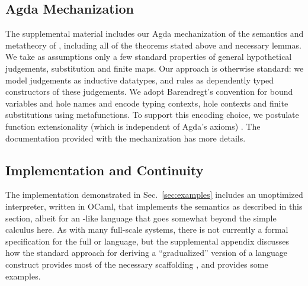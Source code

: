 
\vspace{-3px}
\subsection{Agda Mechanization}
\label{sec:agda-mechanization}
\vspace{-2px}

The supplemental material includes our Agda
mechanization  \cite{norell2009dependently,norell:thesis,Aydemir:2005fk}
of the semantics and metatheory of \HazelnutLive,
including all of the theorems stated above and necessary lemmas.
We take as assumptions only a few standard properties of general hypothetical judgements, substitution and finite maps.
%
%
%
%
%
Our approach is otherwise standard: we model judgements as
inductive datatypes, and rules as dependently typed constructors of these judgements.
%
We adopt Barendregt's convention for bound variables \cite{urban,barendregt84:_lambda_calculus} and hole names and encode typing
contexts, hole contexts and finite substitutions using metafunctions.
To support this encoding choice, we postulate function extensionality (which is independent of Agda's axioms) \cite{awodey2012inductive}.
The documentation provided with the mechanization has more details.

\vspace{-3px}
\subsection{Implementation and Continuity}\label{sec:implementation}
\vspace{-2px}

The \Hazel implementation demonstrated in Sec.~\ref{sec:examples} 
includes an unoptimized interpreter, written in OCaml, that implements the semantics as described
in this section, albeit for an \Elm-like language that goes somewhat beyond the simple
calculus here. As with many full-scale systems, there is not currently a formal
specification for the full \Elm{} or \Hazel language, but the supplemental appendix
discusses how the standard approach for deriving a ``gradualized'' version of a 
language construct provides most of the necessary scaffolding \cite{DBLP:conf/popl/CiminiS16}, and provides some examples.

